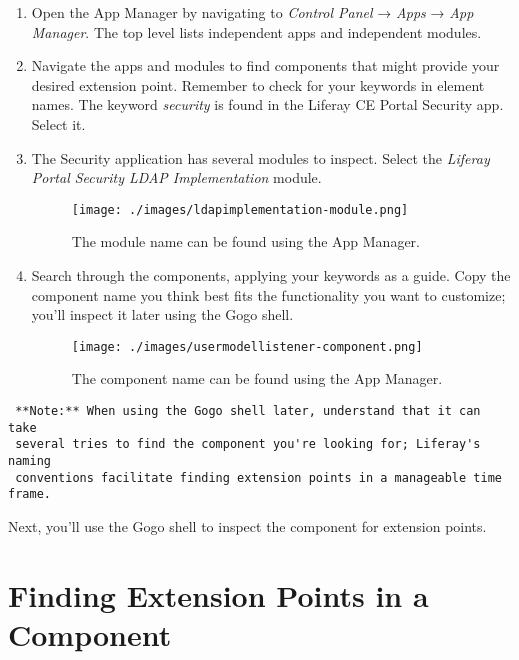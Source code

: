 \begin{enumerate}
\def\labelenumi{\arabic{enumi}.}
\item
  Open the App Manager by navigating to \emph{Control Panel} →
  \emph{Apps} → \emph{App Manager}. The top level lists independent apps
  and independent modules.
\item
  Navigate the apps and modules to find components that might provide
  your desired extension point. Remember to check for your keywords in
  element names. The keyword \emph{security} is found in the Liferay CE
  Portal Security app. Select it.
\item
  The Security application has several modules to inspect. Select the
  \emph{Liferay Portal Security LDAP Implementation} module.

  \begin{figure}
  \centering
  \texttt{[image: ./images/ldapimplementation-module.png]}
  \caption{The module name can be found using the App Manager.}
  \end{figure}
\item
  Search through the components, applying your keywords as a guide. Copy
  the component name you think best fits the functionality you want to
  customize; you'll inspect it later using the Gogo shell.

  \begin{figure}
  \centering
  \texttt{[image: ./images/usermodellistener-component.png]}
  \caption{The component name can be found using the App Manager.}
  \end{figure}
\end{enumerate}

\noindent\hrulefill

\begin{verbatim}
 **Note:** When using the Gogo shell later, understand that it can take 
 several tries to find the component you're looking for; Liferay's naming 
 conventions facilitate finding extension points in a manageable time frame. 
\end{verbatim}

\noindent\hrulefill

Next, you'll use the Gogo shell to inspect the component for extension
points.

\section{Finding Extension Points in a
Component}\label{finding-extension-points-in-a-component}

